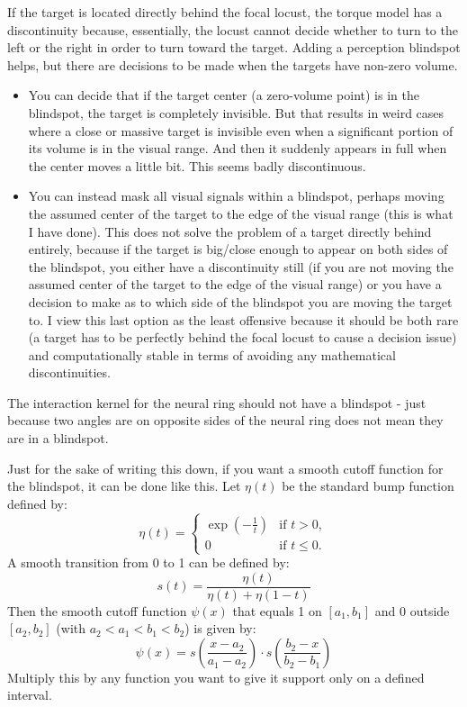 \documentclass[12pt]{article}
\begin{document}
If the target is located directly behind the focal locust, the torque model has a discontinuity because, essentially, the locust cannot decide whether to turn to the left or the right in order to turn toward the target. Adding a perception blindspot helps, but there are decisions to be made when the targets have non-zero volume.
\begin{itemize}
	\item You can decide that if the target center (a zero-volume point) is in the blindspot, the target is completely invisible. But that results in weird cases where a close or massive target is invisible even when a significant portion of its volume is in the visual range. And then it suddenly appears in full when the center moves a little bit. This seems badly discontinuous.
	\item You can instead mask all visual signals within a blindspot, perhaps moving the assumed center of the target to the edge of the visual range  (this is what I have done). This does not solve the problem of a target directly behind entirely, because if the target is big/close enough to appear on both sides of the blindspot, you either have a discontinuity still (if you are not moving the assumed center of the target to the edge of the visual range) or you have a decision to make as to which side of the blindspot you are moving the target to. I view this last option as the least offensive because it should be both rare (a target has to be perfectly behind the focal locust to cause a decision issue) and computationally stable in terms of avoiding any mathematical discontinuities.
\end{itemize}

The interaction kernel for the neural ring should not have a blindspot - just because two angles are on opposite sides of the neural ring does not mean they are in a blindspot.

Just for the sake of writing this down, if you want a smooth cutoff function for the blindspot, it can be done like this. Let $\eta(t)$ be the standard bump function defined by:
\[
\eta(t) = 
\begin{cases}
	\exp\left( -\frac{1}{t} \right) & \text{if } t > 0, \\
	0 & \text{if } t \leq 0.
\end{cases}
\]
A smooth transition from 0 to 1 can be defined by:
\[
s(t) = \frac{\eta(t)}{\eta(t) + \eta(1 - t)}
\]
Then the smooth cutoff function $\psi(x)$ that equals 1 on $[a_1, b_1]$ and 0 outside $[a_2, b_2]$ (with $a_2 < a_1 < b_1 < b_2$) is given by:
\[
\psi(x) = s\left( \frac{x - a_2}{a_1 - a_2} \right) \cdot
s\left( \frac{b_2 - x}{b_2 - b_1} \right)
\]
Multiply this by any function you want to give it support only on a defined interval.
\end{document}
